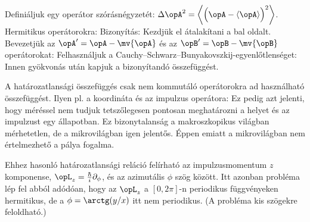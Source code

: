    Definiáljuk egy operátor szórásnégyzetét: $\Delta\opA^2=\left\langle\Big(\opA-\langle\opA\rangle\Big)^2\right\rangle$.
   Hermitikus operátorokra:
   Bizonyítás: Kezdjük el átalakítani a bal oldalt.
   Bevezetjük az $\opA'=\opA-\mv{\opA}$ és az $\opB'=\opB-\mv{\opB}$ operátorokat:
   Felhasználjuk a Cauchy--Schwarz--Bunyakovszkij-egyenlőtlenséget:
   Innen gyökvonás után kapjuk a bizonyítandó összefüggést. 
   
   A határozatlansági összefüggés csak nem kommutáló operátorokra ad használható összefüggést.
   Ilyen pl. a koordináta és az impulzus operátora: 
   Ez pedig azt jelenti, hogy méréssel nem tudjuk tetszőlegesen pontosan meghatározni a helyet és az impulzust egy állapotban.
   Ez bizonytalanság a makroszkopikus világban mérhetetlen, de a mikrovilágban igen jelentős. Éppen emiatt a mikrovilágban nem értelmezhető a pálya fogalma.
   
   Ehhez hasonló határozatlansági reláció felírható az impulzusmomentum $z$ komponense, $\opL_z=\frac\hbar i \partial_\phi$, és az azimutális $\phi$ szög között.
   Itt azonban probléma lép fel abból adódóan, hogy az $\opL_z$ a $[0,2\pi]$-n periodikus függvényeken hermitikus, de a $\phi=\arctg(y/x)$ itt nem periodikus. (A probléma kis szögekre feloldható.)
   
